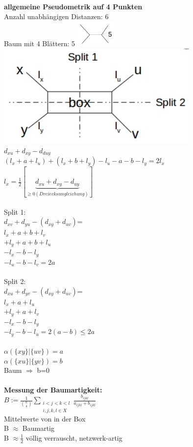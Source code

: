 \textbf{allgemeine Pseudometrik auf 4 Punkten}\\
Anzahl unabhängigen Distanzen: 6\\
Baum mit 4 Blättern: 5
\includegraphics[width=0.15\textwidth]{lectures/161216/pix/4.jpg}\\
\includegraphics[width=0.75\textwidth]{lectures/161216/pix/5.jpg}\\
$d_{xu} + d_{xy} - d_{duy}$\\
$(l_x+a+l_u)+(l_x+b+l_y)-l_u-a-b-l_y=2l_x$\\
$l_x=\frac{1}{2}[\underbrace{d_{xu}+d_{xy}-d_{uy}}_{\geq 0 (Dreiecksungleichung)}]$\\\\
Split 1:\\
$d_{xv}+d_{yu}-(d_{xy}+d_{uv})$=\\
$l_x+a+b+l_v$\\
$+l_y+a+b+l_u$\\
$-l_x-b-l_y$\\
$-l_u-b-l_v=2a$\\\\
Split 2:\\
$d_{xu}+d_{yv}-(d_{xy}+d_{uv})$=\\
$l_x+a+l_u$\\
$+l_y+a+l_v$\\
$-l_x-b-l_y$\\
$-l_y-b-l_u=2(a-b) \leq 2a$\\\\

$\alpha(\{xy\}|\{uv\})=a$\\
$\alpha(\{xu\}|\{yv\})=b$\\
Baum $\Rightarrow$ b=0\\\\

\textbf{Messung der Baumartigkeit:}\\
$B:=\frac{1}{\binom{n}{4}} \displaystyle\sum_{\substack{i<j<k<l \\ i,j,k,l \in X}} \frac{b_{ijkl}}{a_{ijkl} + b_{ijkl}}$\\
Mittelwerte von in der Box\\
B $\approx$ Baumartig\\
B $\approx \frac{1}{2}$ völlig verrauscht, netzwerk-artig\\

